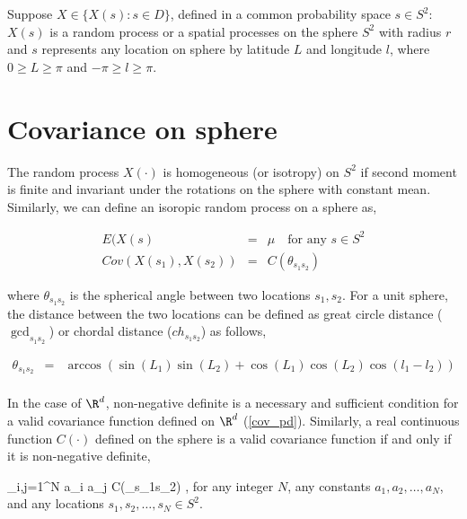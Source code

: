 

Suppose $X \in \{X(s): s\in D\}$, defined in a common probability space $s \in S^2$: $X(s)$ is a random process or a spatial processes on the sphere $S^2$ with radius $r$ and $s$ represents any location on sphere by latitude $L$ and longitude $l$, where $0 \ge L \ge \pi$ and $-\pi \ge l \ge \pi$.\\


\section{Covariance on sphere} 

The random process $X(\cdot)$ is  homogeneous (or isotropy) on $S^2$ if second moment is finite and invariant under the rotations on the sphere with constant mean. Similarly, we can define an isoropic random process on a sphere as, 

\begin{eqnarray*}
	E(X(s) &=& \mu \quad \mbox{for any } s\in S^2 \\
	Cov(X(s_1),X(s_2)) &=& C(\theta_{s_1s_2}) 
\end{eqnarray*}

where $\theta_{s_1s_2}$ is the spherical angle between two locations $s_1,s_2$. For a unit sphere, the distance between the two locations can be defined as great circle distance ($\gcd_{s_1s_2}$) or chordal distance ($ch_{s_1s_2}$) as follows,

\begin{eqnarray*}
	\theta_{s_1s_2}  &=& \arccos\left(\sin(L_1)\sin(L_2) + \cos(L_1)\cos(L_2)\cos(l_1-l_2)\right)\\
\end{eqnarray*}

In the case of $\R^d$, non-negative definite is a necessary and sufficient condition for a valid covariance function defined on $\R^d$ (\ref{cov_pd}). Similarly, a real continuous function $C(\cdot)$ defined on the sphere is a valid covariance function if and only if it is non-negative definite,

\beq
\sum_{i,j=1}^{N} a_i a_j C(\theta_{s_1s_2}) ,
\eeq
for any integer $N$, any constants $a_1, a_2, \ldots, a_N$, and any locations $s_1, s_2, \ldots, s_N \in S^2$.


